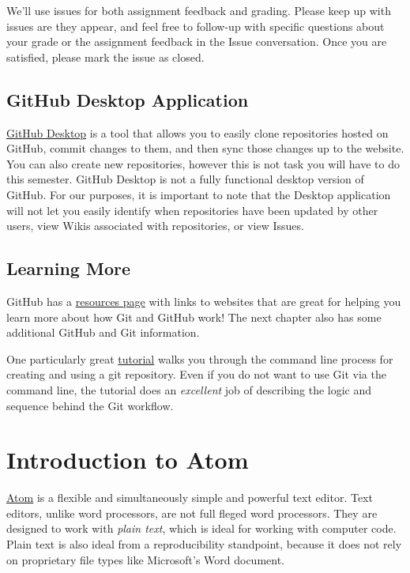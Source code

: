 \documentclass[]{book}
\begin{document}
We'll use issues for both assignment feedback and grading. Please keep
up with issues are they appear, and feel free to follow-up with specific
questions about your grade or the assignment feedback in the Issue
conversation. Once you are satisfied, please mark the issue as closed.

\section{GitHub Desktop Application}\label{github-desktop-application}

\href{https://desktop.github.com}{GitHub Desktop} is a tool that allows
you to easily clone repositories hosted on GitHub, commit changes to
them, and then sync those changes up to the website. You can also create
new repositories, however this is not task you will have to do this
semester. GitHub Desktop is not a fully functional desktop version of
GitHub. For our purposes, it is important to note that the Desktop
application will not let you easily identify when repositories have been
updated by other users, view Wikis associated with repositories, or view
Issues.

\section{Learning More}\label{learning-more}

GitHub has a
\href{https://help.github.com/articles/good-resources-for-learning-git-and-github/}{resources
page} with links to websites that are great for helping you learn more
about how Git and GitHub work! The next chapter also has some additional
GitHub and Git information.

One particularly great \href{https://try.github.io/}{tutorial} walks you
through the command line process for creating and using a git
repository. Even if you do not want to use Git via the command line, the
tutorial does an \emph{excellent} job of describing the logic and
sequence behind the Git workflow.

\chapter{Introduction to Atom}\label{introduction-to-atom}

\href{https://atom.io}{Atom} is a flexible and simultaneously simple and
powerful text editor. Text editors, unlike word processors, are not full
fleged word processors. They are designed to work with \emph{plain
text}, which is ideal for working with computer code. Plain text is also
ideal from a reproducibility standpoint, because it does not rely on
proprietary file types like Microsoft's Word document.
\end{document}
